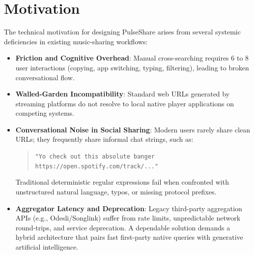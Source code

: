 \documentclass[12pt,a4paper]{report}
\begin{document}
\section{Motivation}
The technical motivation for designing PulseShare arises from several systemic deficiencies in existing music-sharing workflows:
\begin{itemize}
    \item \textbf{Friction and Cognitive Overhead}: Manual cross-searching requires 6 to 8 user interactions (copying, app switching, typing, filtering), leading to broken conversational flow.
    \item \textbf{Walled-Garden Incompatibility}: Standard web URLs generated by streaming platforms do not resolve to local native player applications on competing systems.
    \item \textbf{Conversational Noise in Social Sharing}: Modern users rarely share clean URLs; they frequently share informal chat strings, such as:
    \begin{quote}
        \texttt{"Yo check out this absolute banger https://open.spotify.com/track/..."}
    \end{quote}
    Traditional deterministic regular expressions fail when confronted with unstructured natural language, typos, or missing protocol prefixes.
    \item \textbf{Aggregator Latency and Deprecation}: Legacy third-party aggregation APIs (e.g., Odesli/Songlink) suffer from rate limits, unpredictable network round-trips, and service deprecation. A dependable solution demands a hybrid architecture that pairs fast first-party native queries with generative artificial intelligence.
\end{itemize}
\end{document}
